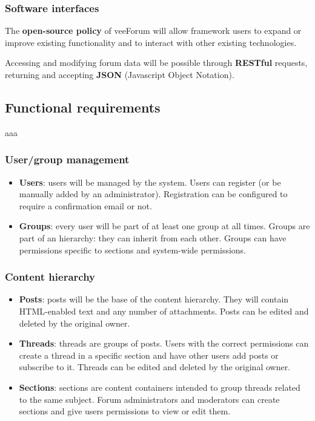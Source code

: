\documentclass[12pt]{report}
\renewcommand\emph{\textbf}
\begin{document}
                    \subsubsection{Software interfaces}
                        The \emph{open-source policy} of veeForum will allow framework users to expand or improve existing functionality and to interact with other existing technologies.

                        Accessing and modifying forum data will be possible through \emph{RESTful} requests, returning and accepting \emph{JSON} (Javascript Object Notation).

                \subsection{Functional requirements}
                    aaa

                    \subsubsection{User/group management}
                        \begin{itemize}
                            \item \emph{Users}: users will be managed by the system. Users can register (or be manually added by an administrator). Registration can be configured to require a confirmation email or not.
                            \item \emph{Groups}: every user will be part of at least one group at all times. Groups are part of an hierarchy: they can inherit from each other. Groups can have permissions specific to sections and system-wide permissions.
                        \end{itemize}

                     \subsubsection{Content hierarchy}
                        \begin{itemize}
                            \item \emph{Posts}: posts will be the base of the content hierarchy. They will contain HTML-enabled text and any number of attachments.
                            Posts can be edited and deleted by the original owner.
                            \item \emph{Threads}: threads are groups of posts. Users with the correct permissions can create a thread in a specific section and have other users add posts or subscribe to it.
                            Threads can be edited and deleted by the original owner.
                            \item \emph{Sections}: sections are content containers intended to group threads related to the same subject. Forum administrators and moderators can create sections and give users permissions to view or edit them.
                        \end{itemize}
\end{document}
